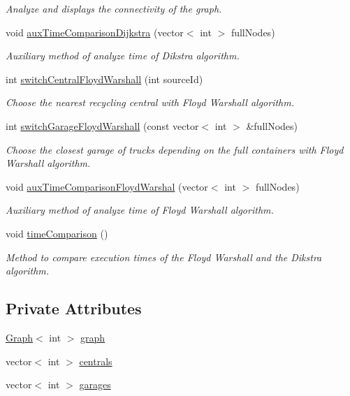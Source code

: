 \begin{DoxyCompactItemize}
\begin{DoxyCompactList}\small\item\em Analyze and displays the connectivity of the graph. \end{DoxyCompactList}\item 
void \hyperlink{classSmartWaste_a8b92a14b2fc83e86d9fa797dec00ae0e}{aux\+Time\+Comparison\+Dijkstra} (vector$<$ int $>$ full\+Nodes)
\begin{DoxyCompactList}\small\item\em Auxiliary method of analyze time of Dikstra algorithm. \end{DoxyCompactList}\item 
int \hyperlink{classSmartWaste_a69c3a37338ea2c3c49b3e600d45a7afa}{switch\+Central\+Floyd\+Warshall} (int source\+Id)
\begin{DoxyCompactList}\small\item\em Choose the nearest recycling central with Floyd Warshall algorithm. \end{DoxyCompactList}\item 
int \hyperlink{classSmartWaste_a3440495b88d51595261af349753c3b4e}{switch\+Garage\+Floyd\+Warshall} (const vector$<$ int $>$ \&full\+Nodes)
\begin{DoxyCompactList}\small\item\em Choose the closest garage of trucks depending on the full containers with Floyd Warshall algorithm. \end{DoxyCompactList}\item 
void \hyperlink{classSmartWaste_a0cd6a174d186a2cf5e4d4de10df0b48c}{aux\+Time\+Comparison\+Floyd\+Warshal} (vector$<$ int $>$ full\+Nodes)
\begin{DoxyCompactList}\small\item\em Auxiliary method of analyze time of Floyd Warshall algorithm. \end{DoxyCompactList}\item 
void \hyperlink{classSmartWaste_a9afdadb947d0c2fcb979e3470c4e2721}{time\+Comparison} ()
\begin{DoxyCompactList}\small\item\em Method to compare execution times of the Floyd Warshall and the Dikstra algorithm. \end{DoxyCompactList}\end{DoxyCompactItemize}
\subsection*{Private Attributes}
\begin{DoxyCompactItemize}
\item 
\hyperlink{classGraph}{Graph}$<$ int $>$ \hyperlink{classSmartWaste_a653f3e0a3fb2148fb3e59ec9532f6d04}{graph}
\item 
vector$<$ int $>$ \hyperlink{classSmartWaste_aac31f2b8c6bd3f931346024435e36f5f}{centrals}
\item 
vector$<$ int $>$ \hyperlink{classSmartWaste_a624a2893edb7c0e00e4fefe635a0c597}{garages}
\end{DoxyCompactItemize}


